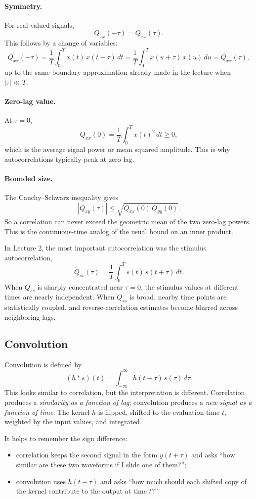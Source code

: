 \documentclass[11pt]{article}
\begin{document}
\paragraph{Symmetry.}
For real-valued signals,
\[
Q_{xx}(-\tau)=Q_{xx}(\tau).
\]
This follows by a change of variables:
\[
Q_{xx}(-\tau)=\frac{1}{T}\int_0^T x(t)\,x(t-\tau)\,dt
=\frac{1}{T}\int_0^T x(u+\tau)\,x(u)\,du
=Q_{xx}(\tau),
\]
up to the same boundary approximation already made in the lecture when $|\tau|\ll T$.

\paragraph{Zero-lag value.}
At $\tau=0$,
\[
Q_{xx}(0)=\frac{1}{T}\int_0^T x(t)^2\,dt \ge 0,
\]
which is the average signal power or mean squared amplitude. This is why autocorrelations typically peak at zero lag.

\paragraph{Bounded size.}
The Cauchy--Schwarz inequality gives
\[
|Q_{xy}(\tau)| \le \sqrt{Q_{xx}(0)\,Q_{yy}(0)}.
\]
So a correlation can never exceed the geometric mean of the two zero-lag powers. This is the continuous-time analog of the usual bound on an inner product.

In Lecture 2, the most important autocorrelation was the stimulus autocorrelation,
\[
Q_{ss}(\tau)=\frac{1}{T}\int_0^T s(t)\,s(t+\tau)\,dt.
\]
When $Q_{ss}$ is sharply concentrated near $\tau=0$, the stimulus values at different times are nearly independent. When $Q_{ss}$ is broad, nearby time points are statistically coupled, and reverse-correlation estimates become blurred across neighboring lags.

\subsection{Convolution}

Convolution is defined by
\[
(h*s)(t)=\int_{-\infty}^{\infty} h(t-\tau)\,s(\tau)\,d\tau.
\]
This looks similar to correlation, but the interpretation is different. Correlation produces a \emph{similarity as a function of lag}; convolution produces a \emph{new signal as a function of time}. The kernel $h$ is flipped, shifted to the evaluation time $t$, weighted by the input values, and integrated.

It helps to remember the sign difference:
\begin{itemize}
    \item correlation keeps the second signal in the form $y(t+\tau)$ and asks ``how similar are these two waveforms if I slide one of them?'';
    \item convolution uses $h(t-\tau)$ and asks ``how much should each shifted copy of the kernel contribute to the output at time $t$?''
\end{itemize}
\end{document}
